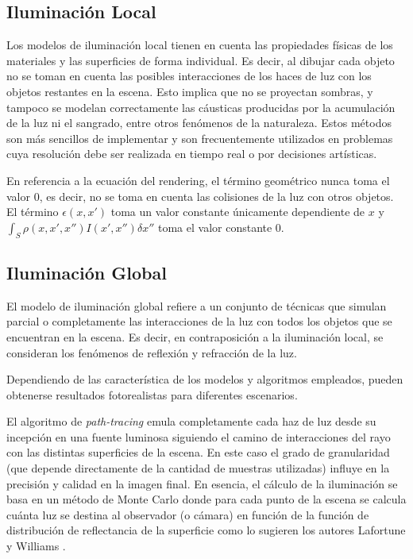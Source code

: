 \subsection{Iluminación Local}
\label{sec:ilumlocal}
Los modelos de iluminación local tienen en cuenta las propiedades físicas de los materiales
y las superficies de forma individual. Es decir, al dibujar cada objeto no se toman en cuenta las posibles interacciones de los haces de luz con los objetos restantes en la escena. Esto implica que no se proyectan sombras, y tampoco se modelan correctamente las cáusticas producidas por la acumulación de la luz ni el sangrado, entre otros fenómenos de la naturaleza. Estos métodos son más sencillos de implementar y son frecuentemente utilizados en problemas cuya resolución debe ser realizada en tiempo real o por decisiones artísticas.

En referencia a la ecuación del rendering, el término geométrico nunca toma el valor 0, es decir, no se toma en cuenta las colisiones de la luz con otros objetos. El término $\epsilon(x,x')$ toma un valor constante únicamente dependiente de $x$ y $\int_{S} \rho(x,x',x'')I(x',x'') \delta x''$ toma el valor constante $0$.

\subsection{Iluminación Global}
\label{sec:ilumglobal}

El modelo de iluminación global refiere a un conjunto de técnicas que simulan parcial o completamente las interacciones de la luz con todos los objetos que se encuentran  en la escena. Es decir, en contraposición a la iluminación local, se consideran los fenómenos de reflexión y refracción de la luz.

Dependiendo de las característica de los modelos y algoritmos empleados, pueden obtenerse resultados fotorealistas para diferentes escenarios.

El algoritmo de \textit{path-tracing} emula completamente cada haz de luz desde su incepción en una fuente luminosa siguiendo el camino de interacciones del rayo con las distintas superficies de la escena. En este caso el grado de granularidad (que depende directamente de la cantidad de muestras utilizadas) influye en la precisión y calidad en la imagen final. En esencia, el cálculo de la iluminación se basa en un método de Monte Carlo donde para cada punto de la escena se calcula cuánta luz se destina al observador (o cámara) en función de la función de distribución de reflectancia de la superficie como lo sugieren los autores Lafortune y Williams \cite{LW1993BPT}.

